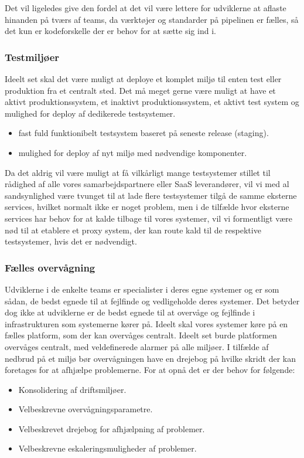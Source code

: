 \documentclass{article}
\begin{document}
Det vil ligeledes give den fordel at det vil være lettere for udviklerne at aflaste hinanden på tværs af teams, da værktøjer og standarder på pipelinen er fælles, så det kun er kodeforskelle der er behov for at sætte sig ind i.
 

\subsubsection{Testmiljøer}
Ideelt set skal det være muligt at deploye et komplet miljø til enten test eller produktion fra et centralt sted. Det må meget gerne være muligt at have et aktivt produktionssystem, et inaktivt produktionssystem, et aktivt test system og mulighed for deploy af dedikerede testsystemer. 

\begin{itemize}
    \item fast fuld funktionibelt testsystem baseret på seneste release (staging).
    \item mulighed for deploy af nyt miljø med nødvendige komponenter.
\end{itemize}

Da det aldrig vil være muligt at få vilkårligt mange testsystemer stillet til rådighed af alle vores samarbejdspartnere eller SaaS leverandører, vil vi med al sandsynlighed være tvunget til at lade flere testsystemer tilgå de samme eksterne services, hvilket normalt ikke er noget problem, men i de tilfælde hvor eksterne services har behov for at kalde tilbage til vores systemer, vil vi formentligt være nød til at etablere et proxy system, der kan route kald til de respektive testsystemer, hvis det er nødvendigt.


\subsubsection{Fælles overvågning}
Udviklerne i de enkelte teams er specialister i deres egne systemer og er som sådan, de bedst egnede til at fejlfinde og vedligeholde deres systemer. Det betyder dog ikke at udviklerne er de bedst egnede til at overvåge og fejlfinde i infrastrukturen som systemerne kører på. Ideelt skal vores systemer køre på en fælles platform, som der kan overvåges centralt.
Ideelt set burde platformen overvåges centralt, med veldefinerede alarmer på alle miljøer. I tilfælde af nedbrud på et miljø bør overvågningen have en drejebog på hvilke skridt der kan foretages for at afhjælpe problemerne.
For at opnå det er der behov for følgende:
\begin{itemize}
\item Konsolidering af driftsmiljøer.
\item Velbeskrevne overvågningsparametre.
\item Velbeskrevet drejebog for afhjælpning af problemer.
\item Velbeskrevne eskaleringsmuligheder af problemer.
\end{itemize}
\end{document}
